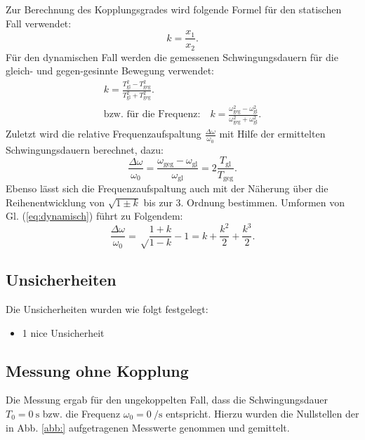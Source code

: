 \documentclass[11pt,a4paper,titlepage, ngerman]{article}
\newcommand{\refeq}[1]{Gl. (\ref{eq:#1})}
\newcommand{\refabb}[1]{Abb. \ref{abb:#1}}
\begin{document}
			Zur Berechnung des Kopplungsgrades wird folgende Formel für den statischen Fall verwendet: 
			\begin{equation}
				k = \frac{x_1}{x_2}. \label{eq:statisch}
			\end{equation}
			Für den dynamischen Fall werden die gemessenen Schwingungsdauern für die gleich- und gegen-gesinnte Bewegung verwendet:
			\begin{align}
				k = \frac{T_\text{gl}^2-T_\text{geg}^2}{T_\text{gl}^2+T_\text{geg}^2}. \label{eq:dynamisch} \\
				\text{bzw. für die Frequenz:} \quad k = \frac{\omega_\text{geg}^2-\omega_\text{gl}^2}{\omega_\text{geg}^2+\omega_\text{gl}^2}.
			\end{align}
			Zuletzt wird die relative Frequenzaufspaltung $\frac{\Delta\omega}{\omega_0}$ mit Hilfe der ermittelten Schwingungsdauern berechnet, dazu:
			\begin{equation}
				\frac{\Delta\omega}{\omega_0} = \frac{\omega_\text{geg}-\omega_\text{gl}}{\omega_\text{gl}} = 2\frac{T_\text{gl}}{T_\text{geg}}. \label{eq:freqfrac} 	
			\end{equation}		
			Ebenso lässt sich die Frequenzaufspaltung auch mit der Näherung über die Reihenentwicklung von $\sqrt{1\pm k}$ bis zur 3. Ordnung bestimmen. Umformen von \refeq{dynamisch} führt zu Folgendem:
			\begin{equation}
				\frac{\Delta\omega}{\omega_0} = \sqrt\frac{1+k}{1-k}-1 = k + \frac{k^2}{2} + \frac{k^3}{2}. \label{eq:freqfrac2} 
			\end{equation}
					
		\subsection*{Unsicherheiten}
			
			Die Unsicherheiten wurden wie folgt festgelegt:
			\begin{itemize}
				\item 1 nice Unsicherheit
			\end{itemize}
			
		\subsection{Messung ohne Kopplung}
										
			Die Messung ergab für den ungekoppelten Fall, dass die Schwingungsdauer $T_0 = \SI{0}{\s}$ bzw. die Frequenz $\omega_0 = \SI{0}{\per\s}$ entspricht. Hierzu wurden die Nullstellen der in \refabb{} aufgetragenen Messwerte genommen und gemittelt. 
			
\end{document}

